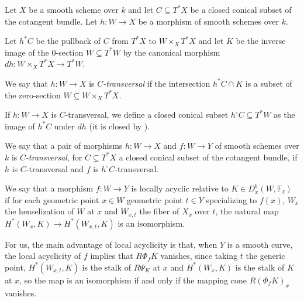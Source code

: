 \begin{definition}
\notready\cite[Definition 3.1]{saito1} Let $X$ be a smooth scheme over $k$ and let $C \subseteq T^* X$ be a closed conical subset of the cotangent bundle. Let $h: W \to X$ be a morphism of smooth schemes over $k$.

Let $h^* C$ be the pullback of $C$ from $T^* X$ to $W \times_X T^* X$ and let $K$ be the inverse image of the $0$-section $W \subseteq T^* W$ by the canonical morphism $dh: W \times_X T^* X \to T^* W$.

We say that $h: W\to X$ is \emph{$C$-transversal} if the intersection $h^* C \cap K$ is a subset of the zero-section $W \subseteq W \times_X T^* X$.

If $h: W \to X$ is $C$-transversal, we define a closed conical subset $h^\circ C \subseteq T^* W$ as the image of $h^* C$ under $dh$ (it is closed by \cite[Lemma 3.1]{saito1}). \end{definition}

\begin{definition}
\notready\cite[Definition 3.5(2)]{saito1} We say that a pair of morphisms $h: W \to X$ and $f:W\to Y$ of smooth schemes over $k$ is \emph{$C$-transversal}, for $C \subseteq T^* X$ a closed conical subset of the cotangent bundle, if $h$ is $C$-transversal and $f$ is $h^\circ C$-transversal. \end{definition}

\begin{definition}
\notready\cite[Th. Finitude, Definition 2.12]{sga4h} We say that a morphism $f: W \to Y$ is locally acyclic relative to $K \in D^b_x(W, \mathbb F_\ell)$ if for each geometric point $x \in W$ geometric point  $t \in Y$ specializing to $f(x)$, $W_x$ the henselization of $W$ at $x$ and $W_{x,t}$ the fiber of $X_x$ over $t$, the natural map $H^* ( W_x, K) \to H^* ( W_{x,t}, K)$ is an isomorphism.  \end{definition}

For us, the main advantage of local acyclicity is that, when $Y$ is a smooth curve, the local acyclicity of $f$ implies that $R\Phi_f K$ vanishes, since taking $t$ the generic point, $H^* ( W_{x,t}, K)$ is the stalk of $R \Psi_ K$ at $x$ and $H^* ( W_x, K) $ is the stalk of $K$ at $x$, so the map is an isomorphism if and only if the mapping cone $R(\Phi_f K)_x$ vanishes.

